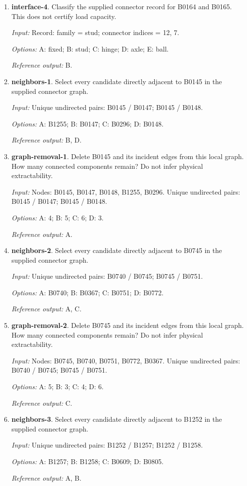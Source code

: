 \begin{enumerate}
\item \textbf{interface-4}. Classify the supplied connector record for B0164 and B0165. This does not certify load capacity.\par {\small \textit{Input:} Record: family = stud; connector indices = 12, 7. \par\textit{Options:} A: fixed; B: stud; C: hinge; D: axle; E: ball. \par\textit{Reference output:} B.}
\item \textbf{neighbors-1}. Select every candidate directly adjacent to B0145 in the supplied connector graph.\par {\small \textit{Input:} Unique undirected pairs: B0145 / B0147; B0145 / B0148. \par\textit{Options:} A: B1255; B: B0147; C: B0296; D: B0148. \par\textit{Reference output:} B, D.}
\item \textbf{graph-removal-1}. Delete B0145 and its incident edges from this local graph. How many connected components remain? Do not infer physical extractability.\par {\small \textit{Input:} Nodes: B0145, B0147, B0148, B1255, B0296. Unique undirected pairs: B0145 / B0147; B0145 / B0148. \par\textit{Options:} A: 4; B: 5; C: 6; D: 3. \par\textit{Reference output:} A.}
\item \textbf{neighbors-2}. Select every candidate directly adjacent to B0745 in the supplied connector graph.\par {\small \textit{Input:} Unique undirected pairs: B0740 / B0745; B0745 / B0751. \par\textit{Options:} A: B0740; B: B0367; C: B0751; D: B0772. \par\textit{Reference output:} A, C.}
\item \textbf{graph-removal-2}. Delete B0745 and its incident edges from this local graph. How many connected components remain? Do not infer physical extractability.\par {\small \textit{Input:} Nodes: B0745, B0740, B0751, B0772, B0367. Unique undirected pairs: B0740 / B0745; B0745 / B0751. \par\textit{Options:} A: 5; B: 3; C: 4; D: 6. \par\textit{Reference output:} C.}
\item \textbf{neighbors-3}. Select every candidate directly adjacent to B1252 in the supplied connector graph.\par {\small \textit{Input:} Unique undirected pairs: B1252 / B1257; B1252 / B1258. \par\textit{Options:} A: B1257; B: B1258; C: B0609; D: B0805. \par\textit{Reference output:} A, B.}

\end{enumerate}
